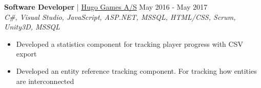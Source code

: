 \documentclass[margin, 10pt, hidelinks]{res} %
\newcommand{\emphasize}{\bf} %
\begin{document}
\begin{resume}
    {\emphasize Software Developer} | \href{https://www.5thplanetgames.com/}{\underline{Hugo Games A/S}}   \hfill May 2016 - May 2017  \\
    {\it C\#, Visual Studio, JavaScript, ASP.NET, MSSQL, HTML/CSS, Scrum, Unity3D, MSSQL} %
    \begin{itemize} \setlength{\itemindent}{-0.1in}\itemsep 0pt %
        \item Developed a statistics component for tracking player progress with CSV export
        \item Developed an entity reference tracking component. For tracking how entities are interconnected
    \end{itemize}




\end{resume}
\end{document}
